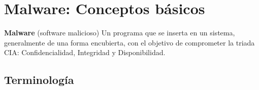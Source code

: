 \documentclass[11pt,a4paper]{article}
\begin{document}
\tableofcontents
\newpage

\section{Malware: Conceptos básicos}

\begin{DefBox}
    \textbf{Malware} (software malicioso) Un programa que se inserta en un sistema, generalmente de una forma encubierta, con el objetivo de comprometer la triada CIA: Confidencialidad, Integridad y Disponibilidad.
\end{DefBox}

\subsection{Terminología}
\end{document}
